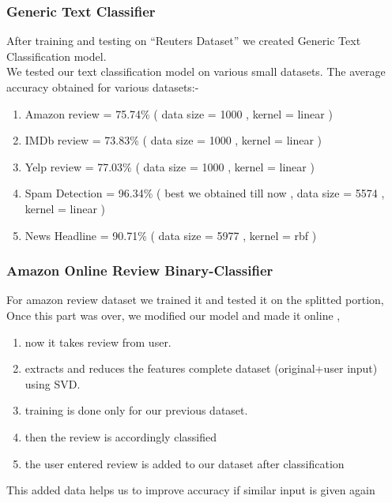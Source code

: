 \documentclass{beamer}
\newcommand\tab[1][1cm]{\hspace*{#1}}
\begin{document}
\begin{frame}
\frametitle{\tab \tab \tab \huge Generic Text Classifier}
After training and testing on \enquote{Reuters Dataset} we created Generic Text Classification model. \\
We tested our text classification model on various small datasets.\linebreak \linebreak
The average accuracy obtained for various datasets:-\\
\begin{enumerate}
\item Amazon review = 75.74\% ( data size = 1000 , kernel = linear )\\
\item IMDb review = 73.83\% ( data size = 1000 , kernel = linear )\\
\item Yelp review = 77.03\% ( data size = 1000 , kernel = linear )\\
\item Spam Detection = 96.34\% ( best we obtained till now , data size = 5574 ,
kernel = linear )\\
\item News Headline = 90.71\% ( data size = 5977 , kernel = rbf )\\
\end{enumerate}
\end {frame}

\begin{frame}
\frametitle{\quad \huge Amazon Online Review Binary-Classifier}

For amazon review dataset we trained it and tested it on the splitted portion,\\
Once this part was over, we modified our model and made it online , \linebreak \linebreak
\begin{enumerate}
\item now it takes review from user.\\
\item extracts and reduces the features complete dataset (original+user input) using SVD.\\
\item training is done only for our previous dataset. \\
\item then the review is accordingly classified \\
\item the user entered review is added to our dataset after classification \linebreak \linebreak
\end{enumerate}
This added data helps us to improve accuracy if similar input is given again

\end{frame}
\end{document}

